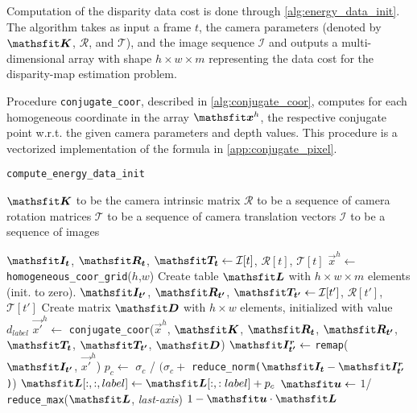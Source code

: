 Computation of the disparity data cost is done through \cref{alg:energy_data_init}.
The algorithm takes as input a frame $t$, the camera parameters (denoted by $\mat K$, $\mathcal R$, and $\mathcal T$), and the image sequence $\mathcal{I}$ and outputs a multi-dimensional array with shape $h\times w \times m$ representing the data cost for the disparity-map estimation problem.

Procedure \texttt{conjugate\_coor}, described in \cref{alg:conjugate_coor}, computes for each homogeneous coordinate in the array $\mat x^h$, the respective conjugate point w.r.t. the given camera parameters and depth values. This procedure is a vectorized implementation of the formula in \cref{app:conjugate_pixel}.

\begin{algorithm}
	\caption{\texttt{compute\_energy\_data\_init}}
	\label{alg:energy_data_init}
               
	\begin{algorithmic}[1]
		\Require $\mat K$ to be the camera intrinsic matrix
		\Require $\mathcal{R}$ to be a sequence of camera rotation matrices
		\Require $\mathcal{T}$ to be a sequence of camera translation vectors
		\Require $\mathcal{I}$ to be a sequence of images
		\Statex

		\State $\mat {I_t}$, $\mat {R_t}$, $\mat {T_t} \leftarrow \mathcal{I}[ t ]$, $\mathcal{R}[t]$, $\mathcal{T}[t]$
		\State $\vec x^h \leftarrow$ \texttt{homogeneous\_coor\_grid}($h$,$w$)
		\State Create table $\mat L$ with $h \times w\times m$ elements (init. to zero).
		\Statex
		\State $\mat{I_{t'}}$, $\mat {R_{t'}}$, $\mat {T_{t'}} \leftarrow \mathcal{I}[ t' ]$,  $\mathcal{R}[t']$, $\mathcal{T}[t']$
		\Statex
		\State Create matrix $\mat D$ with $h \times w$ elements, initialized with value $d_{label}$
		\State $\vec{x'}^h\leftarrow$ \texttt{conjugate\_coor}($\vec x^h$, $\mat K$, $\mat{R_{t}}$, $\mat{R_{t'}}$,  $\mat{ T_{t}}$, $\mat{ T_{t'}}$, $\mat D$)
		\State $\mat{I^r_{t'}} \leftarrow$ \texttt{remap}($\mat{I_{t'}}$, $\vec{x'}^h$)
		\State $p_c \leftarrow$  $\sigma_c$ / $(\sigma_c +$ \texttt{reduce\_norm($\mat{I_t} - \mat{I^r_{t'}}$)})
		\State $\mat L[:,:,label] \leftarrow \mat L[:,:label] + p_c$
		\EndFor
		\EndFor
		\Statex
		\State $\mat u \leftarrow$ $1$/ \texttt{reduce\_max}($\mat L$, \textit{last-axis})
		\State \Return $1 - \mat u\cdot \mat L$
		\EndProcedure
	\end{algorithmic}
\end{algorithm}
